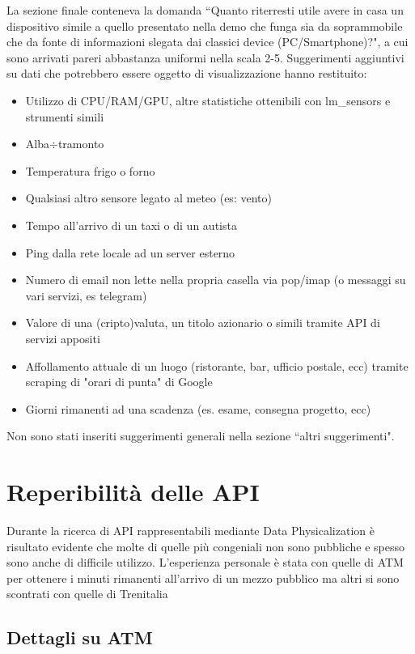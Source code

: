 \documentclass[12pt,a4paper]{report}
\begin{document}
La sezione finale conteneva la domanda ``Quanto riterresti utile avere in casa un dispositivo simile a quello presentato nella demo che
funga sia da soprammobile che da fonte di informazioni slegata dai classici device (PC/Smartphone)?", a cui sono arrivati pareri abbastanza
uniformi nella scala 2-5. Suggerimenti aggiuntivi su dati che potrebbero essere oggetto di visualizzazione hanno restituito:
\begin{itemize}
  \item Utilizzo di CPU/RAM/GPU, altre statistiche ottenibili con lm_sensors e strumenti simili
  \item Alba$\div$tramonto
  \item Temperatura frigo o forno
  \item Qualsiasi altro sensore legato al meteo (es: vento)
  \item Tempo all'arrivo di un taxi o di un autista
  \item Ping dalla rete locale ad un server esterno
  \item Numero di email non lette nella propria casella via pop/imap (o messaggi su vari servizi, es telegram)
  \item Valore di una (cripto)valuta, un titolo azionario o simili tramite API di servizi appositi
  \item Affollamento attuale di un luogo (ristorante, bar, ufficio postale, ecc) tramite scraping di "orari di punta" di Google
  \item Giorni rimanenti ad una scadenza (es. esame, consegna progetto, ecc)
\end{itemize}
Non sono stati inseriti suggerimenti generali nella sezione ``altri suggerimenti".

\section{Reperibilità delle API}
Durante la ricerca di API rappresentabili mediante Data Physicalization è risultato evidente che molte di quelle più congeniali non
sono pubbliche e spesso sono anche di difficile utilizzo. L'esperienza personale è stata con quelle di ATM per ottenere i minuti rimanenti
all'arrivo di un mezzo pubblico ma altri si sono scontrati con quelle di Trenitalia \cite{trenitaliashock}

\subsection{Dettagli su ATM}
\end{document}
